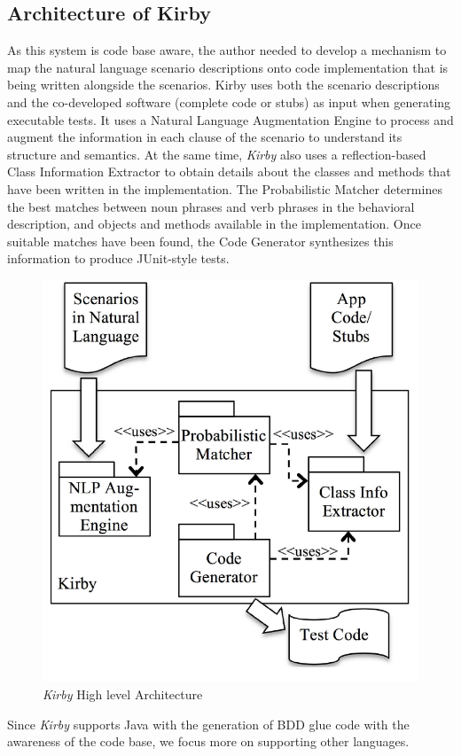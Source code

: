 \documentclass[conference, onecolumn, a4, 12pt]{IEEEtran}
\begin{document}
\subsection{Architecture of Kirby}
 As this system is code base aware, the author needed to develop a mechanism to map the natural language scenario descriptions onto code implementation that is being written alongside the scenarios. Kirby uses both the scenario descriptions and the co-developed software (complete code or stubs) as input when generating executable tests. It uses a Natural Language Augmentation Engine to process and augment the information in each clause of the scenario to understand its structure and semantics. At the same time, \textit{Kirby} also uses a reflection-based Class Information Extractor to obtain details about the classes and methods that have been written in the implementation. The Probabilistic Matcher determines the best matches between noun phrases and verb phrases in the behavioral description, and objects and methods available in the implementation. Once suitable matches have been found, the Code Generator synthesizes this information to produce JUnit-style tests.
 
\begin{figure}
	\centering
	\includegraphics[width=0.7\linewidth]{Kirby_architecture}
	\caption{\textit{Kirby} High level Architecture}
	\label{fig:kirbyarchitecture}
\end{figure}

Since \textit{Kirby} supports Java with the generation of BDD glue code with the awareness of the code base, we focus more on supporting other languages.\newline
\end{document}
